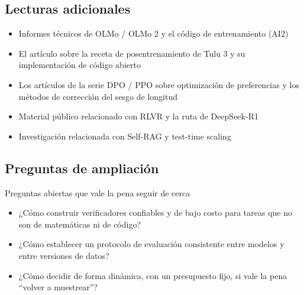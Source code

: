 \subsection{Lecturas adicionales}
\begin{itemize}
    \item Informes técnicos de OLMo / OLMo 2 y el código de entrenamiento (AI2)
    \item El artículo sobre la receta de posentrenamiento de Tulu 3 y su implementación de código abierto
    \item Los artículos de la serie DPO / PPO sobre optimización de preferencias y los métodos de corrección del sesgo de longitud
    \item Material público relacionado con RLVR y la ruta de DeepSeek-R1
    \item Investigación relacionada con Self-RAG y test-time scaling
\end{itemize}

\subsection{Preguntas de ampliación}
\begin{warningbox}{Preguntas abiertas que vale la pena seguir de cerca}
\begin{itemize}
    \item ¿Cómo construir verificadores confiables y de bajo costo para tareas que no son de matemáticas ni de código?
    \item ¿Cómo establecer un protocolo de evaluación consistente entre modelos y entre versiones de datos?
    \item ¿Cómo decidir de forma dinámica, con un presupuesto fijo, si vale la pena ``volver a muestrear''?
\end{itemize}
\end{warningbox}



